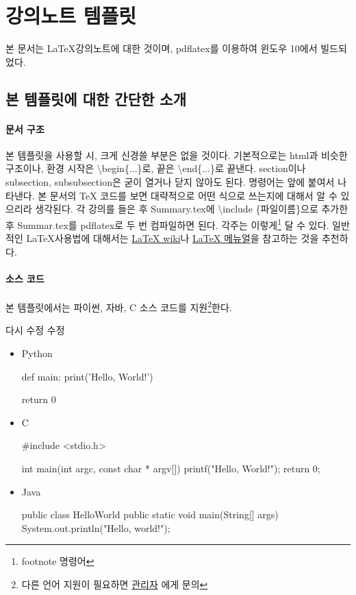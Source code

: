 \section{강의노트 템플릿} 

본 문서는 \LaTeX 강의노트에 대한 것이며, pdflatex를 이용하여 윈도우 10에서 빌드되었다. 

\subsection{본 템플릿에 대한 간단한 소개}

\paragraph{문서 구조} 본 템플릿을 사용할 시, 크게 신경쓸 부분은 없을 것이다. 기본적으로는 html과 비슷한 구조이나, 환경 시작은 {\textbackslash}begin\{...\}로, 끝은 {\textbackslash}end\{...\}로 끝낸다. section이나 subsection, subsubsection은 굳이 열거나 닫지 않아도 된다. 명령어는  앞에 붙여서 나타낸다. 본 문서의 TeX 코드를 보면 대략적으로 어떤 식으로 쓰는지에 대해서 알 수 있으리라 생각된다. 각 강의를 들은 후 Summary.tex에 \textbackslash include \{파일이름\}으로 추가한 후 Summar.tex를 pdflatex로 두 번 컴파일하면 된다. 각주는 이렇게\footnote{footnote 명령어} 달 수 있다. 일반적인 \LaTeX 사용법에 대해서는 \href{http://legacy-wiki.dgoon.net/doku.php?id=latex:latex}{LaTeX wiki}나 \href{http://ftp.isu.edu.tw/pub/Unix/CTAN/info/lshort/korean/lshort-kr.pdf}{LaTeX 메뉴얼}을 참고하는 것을 추천하다.

\paragraph{소스 코드} 본 템플릿에서는 파이썬, 자바, C 소스 코드를 지원\footnote{다른 언어 지원이 필요하면 \href{mailto:principia\_12@kaist.ac.kr}{관리자} 에게 문의}한다. 

다시 수정 수정 
\begin{itemize} 

\item{Python} 

\begin{Python} 
def main:
    print('Hello, World!')
    
    return 0
    
\end{Python} 

\item{C}


\begin{C} 
#include <stdio.h>

int main(int argc, const char * argv[]) 
{
    printf("Hello, World!\n");
    return 0;
}    
\end{C} 

\item{Java}

\begin{Java} 
public class HelloWorld {
    public static void main(String[] args) {
        System.out.println("Hello, world!");
    }
}
\end{Java} 

\end{itemize}

    
